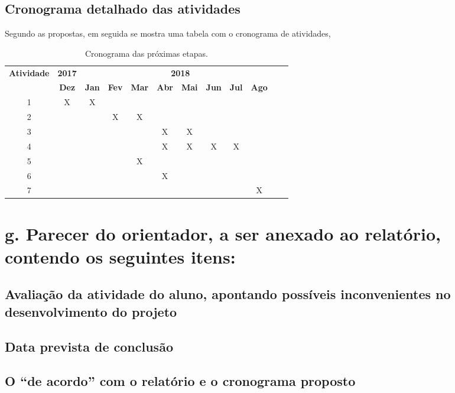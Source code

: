 \documentclass[a4paper, 11pt]{article}
\begin{document}
\subsection{Cronograma detalhado das atividades}
Segundo as propostas, em seguida se mostra uma tabela com o cronograma de atividades,
\begin{table}[H]
\centering
\begin{tabular}{cccccccccccc}
\toprule \multirow{2}{*}{\textbf{Atividade}}& \multicolumn{1}{c}{\textbf{2017}} & \multicolumn{9}{c}{\textbf{2018}} \\ \cline{2-12}
  & \textbf{Dez} & \textbf{Jan} & \textbf{Fev} & \textbf{Mar} & \textbf{Abr} & \textbf{Mai} & \textbf{Jun} & \textbf{Jul} & \textbf{Ago} & \textbf{} & \textbf{}\\ \midrule 
1 & X & X &   &   &   &   &   &   &   &   \\ 
2 &   &   & X & X &   &   &   &   &   &   \\
3 &   &   &   &   & X & X &   &   &   &   \\ 
4 &   &   &   &   & X & X & X & X &   &   \\ 
5 &   &   &   & X &   &   &   &   &   &   \\
6 &   &   &   &   & X &   &   &   &   &   \\
7 &   &   &   &   &   &   &   &   & X &   \\ \bottomrule
\end{tabular}
\caption{Cronograma das pr\'oximas etapas.}
\label{tab:cronograma}
\end{table}

\section{g. Parecer do orientador, a ser anexado ao relatório, contendo os seguintes itens:}

\subsection{Avaliação   da   atividade   do   aluno,   apontando   possíveis   inconvenientes   no desenvolvimento do projeto}
\subsection{Data prevista de conclusão}
\subsection{O “de acordo” com o relatório e o cronograma proposto}
\end{document}
